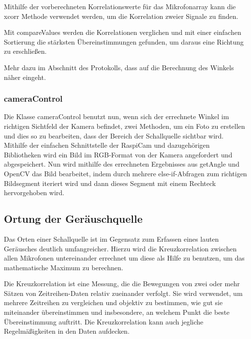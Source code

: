Mithilfe der vorberechneten Korrelationswerte für das Mikrofonarray kann die xcorr Methode verwendet werden, um die Korrelation zweier Signale zu finden.

Mit compareValues werden die Korrelationen verglichen und mit einer einfachen Sortierung die stärksten Übereinstimmungen gefunden, um daraus eine Richtung zu erschließen.

Mehr dazu im Abschnitt des Protokolls, dass auf die Berechnung des Winkels näher eingeht.

\subsubsection{cameraControl}

Die Klasse cameraControl benutzt nun, wenn sich der errechnete Winkel im richtigen Sichtfeld der Kamera befindet, zwei Methoden, um ein Foto zu erstellen und dies so zu bearbeiten, dass der Bereich der Schallquelle sichtbar wird. Mithilfe der einfachen Schnittstelle der RaspiCam und dazugehörigen Bibliotheken wird ein Bild im RGB-Format von der Kamera angefordert und abgespeichert. Nun wird mithilfe des errechneten Ergebnisses aus getAngle und OpenCV das Bild bearbeitet, indem durch mehrere else-if-Abfragen zum richtigen Bildsegment iteriert wird und dann dieses Segment mit einem Rechteck hervorgehoben wird.


\subsection{Ortung der Geräuschquelle}

Das Orten einer Schallquelle ist im Gegensatz zum Erfassen eines lauten Geräusches deutlich umfangreicher. Hierzu wird die Kreuzkorrelation zwischen allen Mikrofonen untereinander errechnet um diese als Hilfe zu benutzen, um das mathematische Maximum zu berechnen.

Die Kreuzkorrelation ist eine Messung, die die Bewegungen von zwei oder mehr Sätzen von Zeitreihen-Daten relativ zueinander verfolgt. Sie wird verwendet, um mehrere Zeitreihen zu vergleichen und objektiv zu bestimmen, wie gut sie miteinander übereinstimmen und insbesondere, an welchem Punkt die beste Übereinstimmung auftritt. Die Kreuzkorrelation kann auch jegliche Regelmäßigkeiten in den Daten aufdecken.

